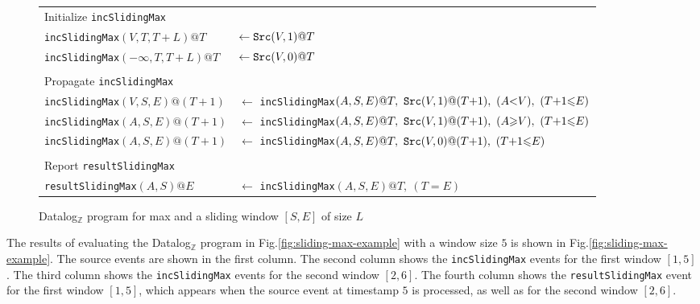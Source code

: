 \begin{figure}[h!]
\begin{mdframed}[leftmargin=0pt,rightmargin=0mm]
\begin{small}
\begin{tabular}{ll}
\multicolumn{2}{l}{Initialize \texttt{incSlidingMax}}\\
\texttt{incSlidingMax}$(V, T, T{+}L)@T$ & $\leftarrow \mbox{\tt Src}(V,1)@T$\\
\texttt{incSlidingMax}$(-\infty, T, T{+}L)@T$ & $\leftarrow \mbox{\tt Src}(V,0)@T$\\
& \\
\multicolumn{2}{l}{Propagate \texttt{incSlidingMax}}\\
\texttt{incSlidingMax}$(V, S, E)@(T{+}1)$ & $\leftarrow$ \texttt{incSlidingMax}$(A, S, E)@T ,\  \mbox{\tt Src}(V,1)@(T{+}1) ,\  (A{<}   V),\ (T{+}1 {\leq} E)$\\
\texttt{incSlidingMax}$(A, S, E)@(T{+}1)$ & $\leftarrow$ \texttt{incSlidingMax}$(A, S, E)@T ,\  \mbox{\tt Src}(V,1)@(T{+}1) ,\  (A{\geq}V),\ (T{+}1 {\leq} E)$\\
\texttt{incSlidingMax}$(A, S, E)@(T{+}1)$ & $\leftarrow$ \texttt{incSlidingMax}$(A, S, E)@T ,\  \mbox{\tt Src}(V,0)@(T{+}1),\ (T{+}1 {\leq} E)$\\
& \\
\multicolumn{2}{l}{Report \texttt{resultSlidingMax}}\\
\texttt{resultSlidingMax}$(A, S)@E$ & $\leftarrow$ \texttt{incSlidingMax}$(A, S, E)@T,\ (T{=}E)$\\
\end{tabular}
\end{small}
\end{mdframed}
\caption{Datalog$_{\mathbb{Z}}$ program for {\sc max} and a sliding window $[S,E]$ of size $L$}
    \label{fig:sliding-max-program}
\end{figure}

The results of evaluating the Datalog$_{\mathbb{Z}}$ program
in Fig.\:\ref{fig:sliding-max-example}
with a window size $5$ is shown in Fig.\:\ref{fig:sliding-max-example}.
The source events are shown in the first column.
The second column shows the \texttt{incSlidingMax} events
for the first window $[1,5]$.
The third column shows the \texttt{incSlidingMax} events
for the second window $[2,6]$.
The fourth column shows the \texttt{resultSlidingMax} event
for the first window $[1,5]$,
which appears when the source event at timestamp $5$ is processed,
as well as for the second window $[2,6]$.


